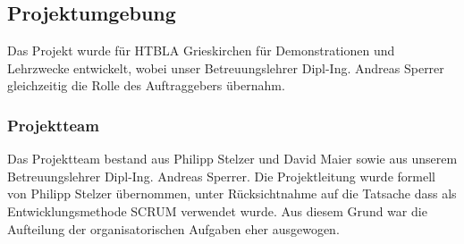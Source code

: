 \subsection{Projektumgebung}
Das Projekt wurde für HTBLA Grieskirchen für Demonstrationen und Lehrzwecke entwickelt, wobei unser Betreuungslehrer Dipl-Ing. Andreas Sperrer gleichzeitig die Rolle des Auftraggebers übernahm. 

\subsubsection{Projektteam}
Das Projektteam bestand aus Philipp Stelzer und David Maier sowie aus unserem Betreuungslehrer Dipl-Ing. Andreas Sperrer. Die Projektleitung wurde formell von Philipp Stelzer übernommen, unter Rücksichtnahme auf die Tatsache dass als Entwicklungsmethode SCRUM verwendet wurde. Aus diesem Grund war die Aufteilung der organisatorischen Aufgaben eher ausgewogen.

